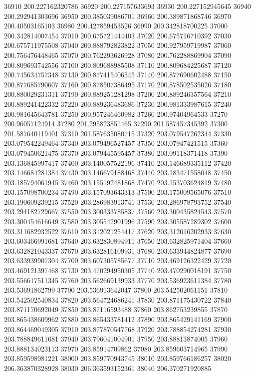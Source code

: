 {36910 200.227162320786
36920 200.227157633693
36930 200.227152945645
36940 200.292941303696
36950 200.385039086701
36960 200.389871868746
36970 200.40503165103
36980 200.427859453526
36990 200.342818700225
37000 200.342814007454
37010 200.675721444403
37020 200.675716710392
37030 200.675711975508
37040 200.888792823822
37050 200.927959719987
37060 200.756476448465
37070 200.762293626928
37080 200.762288869904
37090 200.809693742556
37100 200.809688985508
37110 200.809684225687
37120 200.745634757348
37130 200.877415406545
37140 200.877690602488
37150 200.877685790607
37160 200.878507386495
37170 200.878502535026
37180 200.880029231311
37190 200.889251281298
37200 200.889246357564
37210 200.889241422332
37220 200.889236483686
37230 200.981333987615
37240 200.981645643781
37250 200.957246460982
37260 200.97404964533
37270 200.96057124914
37280 201.295823851465
37290 201.587457345392
37300 201.587640119401
37310 201.587635080715
37320 203.079547262344
37330 203.079542249464
37340 203.079496527457
37350 203.07947421515
37360 203.079450621475
37370 203.079445595457
37380 203.09118371418
37390 203.136845997417
37400 203.140057522196
37410 203.146689335112
37420 203.146684281384
37430 203.146679188468
37440 203.183471558048
37450 203.185794061945
37460 203.155192481868
37470 203.153703624819
37480 203.157098700234
37490 203.157093643313
37500 203.175009565076
37510 203.190609239215
37520 203.286983913741
37530 203.286978793752
37540 203.294182729667
37550 203.300333785837
37560 203.300435824543
37570 203.300454616649
37580 203.305542901996
37590 203.305587289302
37600 203.311682932522
37610 203.312021254417
37620 203.312016202933
37630 203.603466991681
37640 203.632830894911
37650 203.632825971404
37660 203.632821043337
37670 203.632816109931
37680 203.633944824877
37690 203.633939907304
37700 203.607305785677
37710 203.469126322429
37720 203.469121397468
37730 203.470294950305
37740 203.470290018191
37750 203.556617511345
37760 203.562669139933
37770 203.536923611384
37780 203.53691862799
37790 203.536913642047
37800 203.542502061151
37810 203.542502540834
37820 203.564724686241
37830 203.871175430722
37840 203.871170692049
37850 203.87116593488
37860 203.862753239855
37870 203.865438609962
37880 203.865433781412
37890 203.865429141169
37900 203.864469049305
37910 203.877870547768
37920 203.788854274281
37930 203.788849611681
37940 203.796041004901
37950 203.88813874005
37960 203.888134023113
37970 203.85914709862
37980 203.859603714965
37990 203.859598981221
38000 203.859770943745
38010 203.859766186257
38020 206.363870328928
38030 206.363593152361
38040 206.370271920885
}
